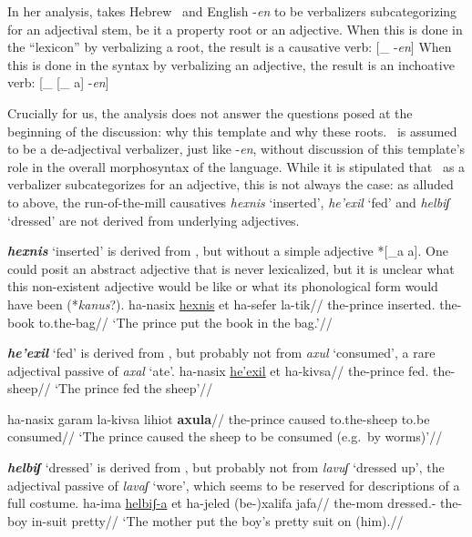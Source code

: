 In her analysis, \citet[136]{borer91} takes Hebrew \thif~and English -\emph{en} to be verbalizers subcategorizing for an adjectival stem, be it a property root or an adjective. %
When this is done in the ``lexicon'' by verbalizing a root, the result is a causative verb:
\ex\label{ex:thif-borer-caus}{[}_{}  -\emph{en}]
\xe
When this is done in the syntax by verbalizing an adjective, the result is an inchoative verb:
\ex\label{ex:thif-borer-inch}{[}_{} [_{}  a] -\emph{en}]
\xe

Crucially for us, the analysis does not answer the questions posed at the beginning of the discussion: why this template and why these roots. \thif~is assumed to be a de-adjectival verbalizer, just like -\emph{en}, without discussion of this template's role in the overall morphosyntax of the language. While it is stipulated that \thif~as a verbalizer subcategorizes for an adjective, this is not always the case: as alluded to above, the run-of-the-mill causatives \emph{hexnis} `inserted', \emph{he'exil} `fed' and \emph{helbiʃ} `dressed' are not derived from underlying adjectives.

\textbf{\emph{hexnis}} `inserted' is derived from , but without a simple adjective *[_{a}  a]. One could posit an abstract adjective that is never lexicalized, but it is unclear what this non-existent adjective would be like or what its phonological form would have been (*\emph{kanus}?).
\ex \begingl
	\gla ha-nasix \underline{hexnis} et ha-sefer la-tik//
	\glb the-prince inserted.  the-book to.the-bag//
	\glft `The prince put the book in the bag.'//
	\endgl
\xe

\textbf{\emph{he'exil}} `fed' is derived from , but probably not from \emph{axul} `consumed', a rare adjectival passive of \emph{axal} `ate'.
\pex
	\a \begingl
		\gla ha-nasix \underline{he'exil} et ha-kivsa//
		\glb the-prince fed.  the-sheep//
		\glft `The prince fed the sheep'//
		\endgl
		
	\a \ljudge{$\ne$} \begingl
		\gla ha-nasix garam la-kivsa lihiot \textbf{axula}//
		\glb the-prince caused to.the-sheep to.be consumed//
		\glft `The prince caused the sheep to be consumed (e.g.~by worms)'//
		\endgl
\xe

\textbf{\emph{helbiʃ}} `dressed' is derived from , but probably not from \emph{lavuʃ} `dressed up', the adjectival passive of \emph{lavaʃ} `wore', which seems to be reserved for descriptions of a full costume.
\pex
	\a \begingl
		\gla ha-ima \underline{helbiʃ-a} et ha-jeled (be-)xalifa jafa//
		\glb the-mom dressed.-  the-boy in-suit pretty//
		\glft `The mother put the boy's pretty suit on (him).//
		\endgl
	
